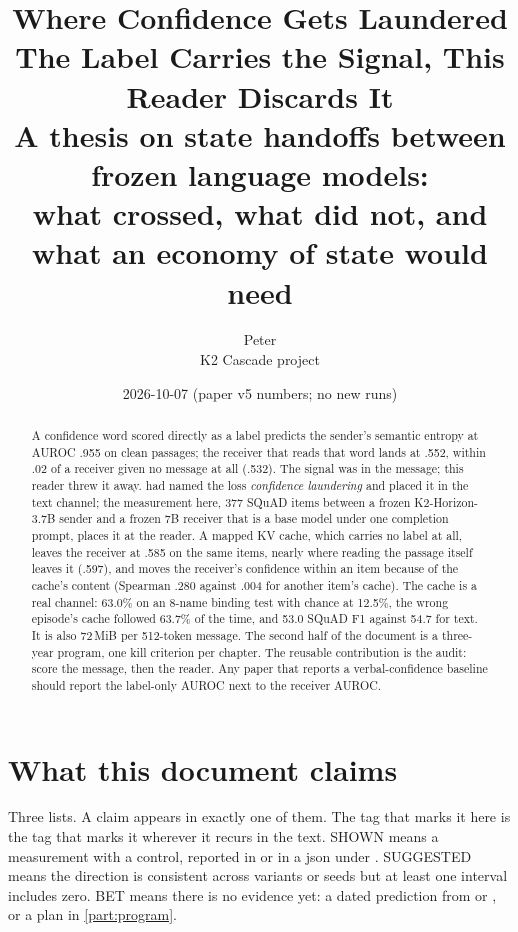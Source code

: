 \documentclass[11pt,a4paper]{report}
\title{\textbf{Where Confidence Gets Laundered}\\[6pt]
\large The Label Carries the Signal, This Reader Discards It\\[10pt]
\normalsize A thesis on state handoffs between frozen language models:\\
what crossed, what did not, and what an economy of state would need}
\author{Peter\\ K2 Cascade project}
\date{2026-10-07 \quad (paper v5 numbers; no new runs)}
\begin{document}
\maketitle

\begin{abstract}
\noindent
A confidence word scored directly as a label predicts the sender's semantic entropy at AUROC .955 on clean passages; the receiver that reads that word lands at .552, within .02 of a receiver given no message at all (.532). The signal was in the message; this reader threw it away. \citet{2606.20662} had named the loss \emph{confidence laundering} and placed it in the text channel; the measurement here, 377 SQuAD items between a frozen K2-Horizon-3.7B sender and a frozen 7B receiver that is a base model under one completion prompt, places it at the reader. A mapped KV cache, which carries no label at all, leaves the receiver at .585 on the same items, nearly where reading the passage itself leaves it (.597), and moves the receiver's confidence within an item because of the cache's content (Spearman .280 against .004 for another item's cache). The cache is a real channel: 63.0\% on an 8-name binding test with chance at 12.5\%, the wrong episode's cache followed 63.7\% of the time, and 53.0 SQuAD F1 against 54.7 for text. It is also 72\,MiB per 512-token message. The second half of the document is a three-year program, one kill criterion per chapter. The reusable contribution is the audit: score the message, then the reader. Any paper that reports a verbal-confidence baseline should report the label-only AUROC next to the receiver AUROC.
\end{abstract}

\tableofcontents

\chapter*{What this document claims}

Three lists. A claim appears in exactly one of them. The tag that marks it here is the tag that marks it wherever it recurs in the text. SHOWN means a measurement with a control, reported in  or in a json under . SUGGESTED means the direction is consistent across variants or seeds but at least one interval includes zero. BET means there is no evidence yet: a dated prediction from  or , or a plan in \cref{part:program}.
\end{document}
